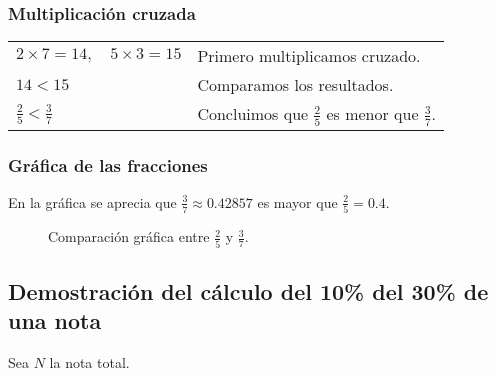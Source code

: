 \documentclass{article}
\begin{document}
\subsubsection{Multiplicación cruzada}
\vspace{0.25em}
\begingroup{}
\begin{tabularx}{\textwidth}{@{}>{\raggedright\arraybackslash}p{} X@{}}
$\displaystyle 2\times7=14,\quad 5\times3=15$ & Primero multiplicamos cruzado. \\[1ex]
$\displaystyle 14<15$ & Comparamos los resultados. \\[1ex]
$\displaystyle \frac{2}{5}< \frac{3}{7}$ & Concluimos que $\tfrac{2}{5}$ es menor que $\tfrac{3}{7}$. \\[1ex]
\end{tabularx}
\endgroup

\subsubsection{Gráfica de las fracciones}

En la gráfica se aprecia que $\frac{3}{7}\approx\num{0.42857}$ es mayor que $\frac{2}{5}=\num{0.4}$.

\begin{figure}[H]
\centering
{}
\caption{Comparación gráfica entre $\frac{2}{5}$ y $\frac{3}{7}$.}
\end{figure}

\subsection{Demostración del cálculo del 10\% del 30\% de una nota}

Sea $N$ la nota total.
\end{document}

